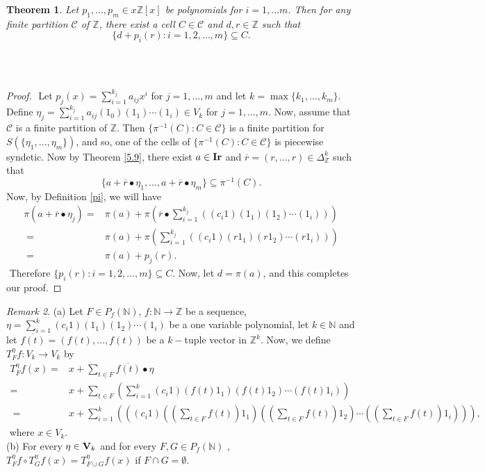 \documentclass{amsart}
\newtheorem{theorem}{Theorem}[section]
\theoremstyle{definition}
\theoremstyle{remark}
\newtheorem{remark}[theorem]{Remark}
\numberwithin{equation}{section}
\newcommand{\Ir}{{\bf{Ir}}}
\newcommand{\V}{{\bf{V}}}
\begin{document}
\begin{theorem}
	Let $p_1,\ldots,p_m\in x\mathbb{Z}[x]$ be polynomials for $i=1,\ldots m$‎. ‎Then for any finite partition $\mathcal{C}$ of \( \mathbb{Z} \), ‎there exist a cell $C\in\mathcal{C}$ and $d,r\in \mathbb{Z}$ such that
	\[
	\{d+p_i(r):i=1,2,\ldots,m\}\subseteq C.
	\]‎ 
\end{theorem}‎
‎\begin{proof}‎
	Let $p_j(x)=\sum_{i=1}^{k_j}a_{ij}x^{i}$ for $j=1,\ldots,m$ and let $k=\max\{k_1,\ldots,k_m\}$‎. ‎Define $\eta_j=\sum_{i=1}^{k_j}a_{ij}(1_0)(1_1)\cdots(1_i)\in V_k$ for $j=1,\ldots,m$‎. ‎Now, assume that $\mathcal{C}$ is a finite partition of $\mathbb{Z}$. Then $\{\pi^{-1}(C):C\in\mathcal{C}\}$ is a finite partition for $S(\{\eta_1,\ldots,\eta_m\})$‎, and so, one of the cells of $\{\pi^{-1}(C):C\in\mathcal{C}\}$ is piecewise syndetic. ‎Now by Theorem \ref{5.9}‎, there exist \( a \in \Ir \) and \( \overline{r}=(r,\ldots,r)\in \Delta_{\mathbb{Z}}^k \) such that
	\[
	\{a + \overline{r}\bullet \eta_1, \dots, a + \overline{r}\bullet \eta_m \}\subseteq \pi^{-1}(C).
	\]
	Now, by Definition \ref{pi}, we will have
	‎\begin{align*}‎	
	‎	\pi(a + \overline{r}\bullet \eta_j)=&\pi(a)+\pi(\overline{r}\bullet\sum_{i=1}^{k_j}((c_i1)(1_1)(1_2)\cdots(1_i)))\\‎
	‎	=&\pi(a)+\pi(\sum_{i=1}^{k_j}((c_i1)(r1_1)(r1_2)\cdots(r1_i)))\\‎
	=&\pi(a)+p_j(r)‎.
	\end{align*}‎
	Therefore $\{p_i(r):i=1,2,\ldots,m\}\subseteq C$‎. Now, let $d=\pi(a)$, and this completes our proof.
\end{proof}
\begin{remark}{\label{4.77}}
(a) ‎Let $F\in P_f(\mathbb{N})$‎, ‎$f:\mathbb{N}\to \mathbb{Z}$ be a sequence, ‎$\eta = \sum_{i=1}^k (c_i1)(1_1)(1_2)\cdots(1_i)$ be a one variable polynomial, let $k\in\mathbb{N}$ and let $\overline{f(t)}=(f(t),\ldots,f(t))$ be a $k-$tuple vector in  $\mathbb{Z}^k$. ‎Now, ‎we define $T_F^{\eta}f:V_k\to V_k$ by
‎\begin{align*}‎
‎T_F^{\eta}f(x)=&x+\sum_{t\in F} \overline{f(t)}\bullet\eta\\
=&x+\sum_{t\in F}\left(\sum_{i=1}^k (c_i1)(f(t)1_1)(f(t)1_2)\cdots(f(t)1_i)\right)\\‎
‎=&x+\sum_{i=1}^k\left(((c_i1)((\sum_{t\in F}f(t))1_1)((\sum_{t\in F}f(t))1_2)\cdots((\sum_{t\in F}f(t))1_i))\right)‎,
‎\end{align*}‎
‎where $x\in V_k$‎. \\
(b) For every $\eta\in\V_k$ and for every $F,G\in P_f(\mathbb{N})$ , $T_F^\eta f\circ T_G^\eta f(x)=T_{F\cup G}^\eta f(x)$ if $F\cap G=\emptyset$.
\end{remark}
\end{document}
